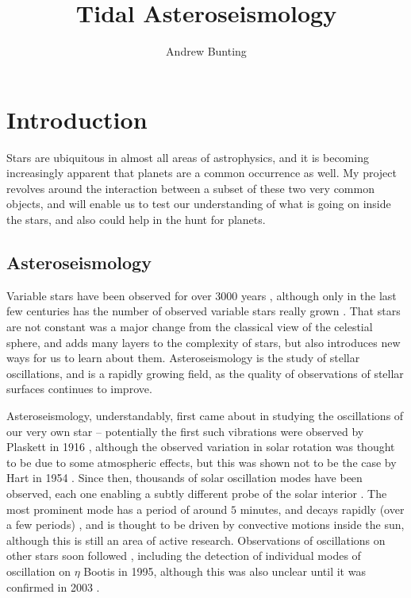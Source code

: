 \documentclass[11pt]{amsart}
\title{Tidal Asteroseismology}
\author{Andrew Bunting}
\begin{document}
\maketitle

\section{Introduction}

Stars are ubiquitous in almost all areas of astrophysics, and it is becoming increasingly apparent that planets are a common occurrence as well.  My project revolves around the interaction between a subset of these two very common objects, and will enable us to test our understanding of what is going on inside the stars, and also could help in the hunt for planets.







\subsection{Asteroseismology}

Variable stars have been observed for over $3000$ years \cite{Jetsu2015}, although only in the last few centuries has the number of observed variable stars really grown \cite{Hoffleit1997}.  That stars are not constant was a major change from the classical view of the celestial sphere, and adds many layers to the complexity of stars, but also introduces new ways for us to learn about them.  Asteroseismology is the study of stellar oscillations, and is a rapidly growing field, as the quality of observations of stellar surfaces continues to improve.

Asteroseismology, understandably, first came about in studying the oscillations of our very own star -- potentially the first such vibrations were observed by Plaskett in 1916 \cite{Plaskett1916}, although the  observed variation in solar rotation was thought to be due to some atmospheric effects, but this was shown not to be the case by Hart in 1954 \cite{Hart1954}.  Since then, thousands of solar oscillation modes have been observed, each one enabling a subtly different probe of the solar interior \cite{DiMauro2017}.  The most prominent mode has a period of around $5$ minutes, and decays rapidly (over a few periods) \cite{Ulrich1970},  and is thought to be driven by convective motions inside the sun, although this is still an area of active research.  Observations of oscillations on other stars soon followed \cite{Brown1991}, including the detection of individual modes of oscillation on $\eta$ Bootis in 1995, although this was also unclear until it was confirmed in 2003 \cite{Kjeldsen2003}.
\end{document}
